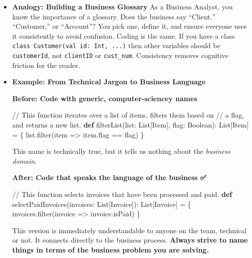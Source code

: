 \documentclass[
  letterpaper,
  DIV=11,
  numbers=noendperiod]{scrreprt}
\newenvironment{Shaded}{\begin{snugshade}}{\end{snugshade}}
\newcommand{\CommentTok}[1]{\textcolor[rgb]{0.37,0.37,0.37}{#1}}
\newcommand{\ExtensionTok}[1]{\textcolor[rgb]{0.00,0.23,0.31}{#1}}
\newcommand{\FunctionTok}[1]{\textcolor[rgb]{0.28,0.35,0.67}{#1}}
\newcommand{\KeywordTok}[1]{\textcolor[rgb]{0.00,0.23,0.31}{\textbf{#1}}}
\newcommand{\NormalTok}[1]{\textcolor[rgb]{0.00,0.23,0.31}{#1}}
\newcommand{\OperatorTok}[1]{\textcolor[rgb]{0.37,0.37,0.37}{#1}}
\begin{document}
\begin{itemize}
\item
  \textbf{Analogy: Building a Business Glossary} As a Business Analyst,
  you know the importance of a glossary. Does the business say
  ``Client,'' ``Customer,'' or ``Account''? You pick one, define it, and
  ensure everyone uses it consistently to avoid confusion. Coding is the
  same. If you have a class
  \texttt{class\ Customer(val\ id:\ Int,\ ...)} then other variables
  should be \texttt{customerId}, not \texttt{clientID} or
  \texttt{cust\_num}. Consistency removes cognitive friction for the
  reader.
\item
  \textbf{Example: From Technical Jargon to Business Language}

  \textbf{Before: Code with generic, computer-sciencey names 🤢}

\begin{Shaded}
\begin{Highlighting}[]
\CommentTok{// This function iterates over a list of items, filters them based on}
\CommentTok{// a flag, and returns a new list.}
\KeywordTok{def} \FunctionTok{filterList}\OperatorTok{(}\NormalTok{list}\OperatorTok{:} \ExtensionTok{List}\OperatorTok{[}\NormalTok{Item}\OperatorTok{],}\NormalTok{ flag}\OperatorTok{:} \ExtensionTok{Boolean}\OperatorTok{):} \ExtensionTok{List}\OperatorTok{[}\NormalTok{Item}\OperatorTok{]} \OperatorTok{=} \OperatorTok{\{}
\NormalTok{    list}\OperatorTok{.}\FunctionTok{filter}\OperatorTok{(}\NormalTok{item }\OperatorTok{=\textgreater{}}\NormalTok{ item}\OperatorTok{.}\NormalTok{flag }\OperatorTok{==}\NormalTok{ flag}\OperatorTok{)}
\OperatorTok{\}}
\end{Highlighting}
\end{Shaded}

  This name is technically true, but it tells us nothing about the
  \emph{business domain}.

  \textbf{After: Code that speaks the language of the business ✅}

\begin{Shaded}
\begin{Highlighting}[]
\CommentTok{// This function selects invoices that have been processed and paid.}
\KeywordTok{def} \FunctionTok{selectPaidInvoices}\OperatorTok{(}\NormalTok{invoices}\OperatorTok{:} \ExtensionTok{List}\OperatorTok{[}\NormalTok{Invoice}\OperatorTok{]):} \ExtensionTok{List}\OperatorTok{[}\NormalTok{Invoice}\OperatorTok{]} \OperatorTok{=} \OperatorTok{\{}
\NormalTok{  invoices}\OperatorTok{.}\FunctionTok{filter}\OperatorTok{(}\NormalTok{invoice }\OperatorTok{=\textgreater{}}\NormalTok{ invoice}\OperatorTok{.}\NormalTok{isPaid}\OperatorTok{)}
\OperatorTok{\}}
\end{Highlighting}
\end{Shaded}

  This version is immediately understandable to anyone on the team,
  technical or not. It connects directly to the business process.
  \textbf{Always strive to name things in terms of the business problem
  you are solving.}
\end{itemize}
\end{document}
